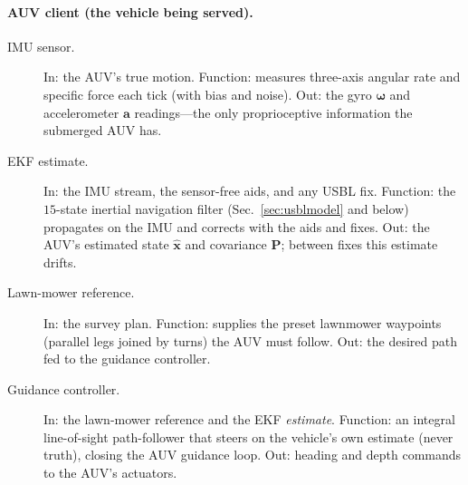 \documentclass[12pt,a4paper,oneside]{book}
\newcommand{\secref}[1]{Sec.~\ref{#1}}
\begin{document}
\paragraph{AUV client (the vehicle being served).}
\begin{description}
\item[IMU sensor.] In: the AUV's true motion. Function: measures three-axis angular rate and specific force
each tick (with bias and noise). Out: the gyro $\boldsymbol{\omega}$ and accelerometer $\mathbf{a}$
readings---the only proprioceptive information the submerged AUV has.
\item[EKF estimate.] In: the IMU stream, the sensor-free aids, and any USBL fix. Function: the $15$-state
inertial navigation filter (\secref{sec:usblmodel} and below) propagates on the IMU and corrects with the
aids and fixes. Out: the AUV's estimated state $\hat{\mathbf{x}}$ and covariance $\mathbf{P}$; between fixes
this estimate drifts.
\item[Lawn-mower reference.] In: the survey plan. Function: supplies the preset lawnmower waypoints
(parallel legs joined by turns) the AUV must follow. Out: the desired path fed to the guidance controller.
\item[Guidance controller.] In: the lawn-mower reference and the EKF \emph{estimate}. Function: an integral
line-of-sight path-follower that steers on the vehicle's own estimate (never truth), closing the AUV
guidance loop. Out: heading and depth commands to the AUV's actuators.
\end{description}
\end{document}
